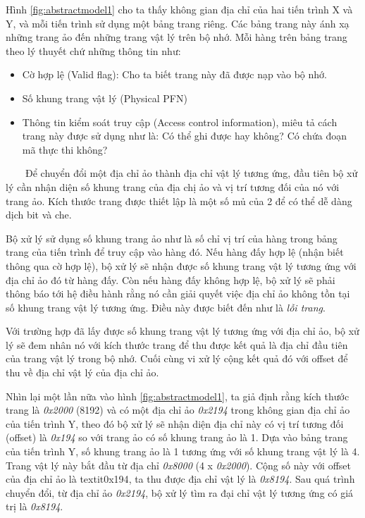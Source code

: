 \documentclass{article}
\begin{document}
Hình \ref{fig:abstractmodel1} cho ta thấy không gian địa chỉ của hai tiến trình X và Y, và mỗi tiến trình sử dụng một bảng trang riêng. Các bảng trang này ánh xạ những trang ảo đến những trang vật lý trên bộ nhớ. Mỗi hàng trên bảng trang theo lý thuyết chứ những thông tin như:
\begin{itemize}
  \item Cờ hợp lệ (Valid flag): Cho ta biết trang này đã được nạp vào bộ nhớ.
  \item Số khung trang vật lý (Physical PFN)
  \item Thông tin kiểm soát truy cập (Access control information), miêu tả cách trang này được sử dụng như là: Có thể ghi được hay không? Có chứa đoạn mã thực thi không?
\end{itemize}
~~~~Để chuyển đổi một địa chỉ ảo thành địa chỉ vật lý tương ứng, đầu tiên bộ xử lý cần nhận diện số khung trang của địa chị ảo và vị trí tương đối của nó với trang ảo. Kích thước trang được thiết lập là một số mủ của 2 để có thể dễ dàng dịch bit và che.\vspace{1em}

Bộ xử lý sử dụng số khung trang ảo như là số chỉ vị trí của hàng trong bảng trang của tiến trình để truy cập vào hàng đó. Nếu hàng đấy hợp lệ (nhận biết thông qua cờ hợp lệ), bộ xử lý sẽ nhận được số khung trang vật lý tương ứng với địa chỉ ảo đó từ hàng đấy. Còn nếu hàng đấy không hợp lệ, bộ xử lý sẽ phải thông báo tới hệ điều hành rằng nó cần giải quyết việc địa chỉ ảo không tồn tại số khung trang vật lý tương ứng. Điều này được biết đến như là \textit{lỗi trang}. \vspace{1em}

Với trường hợp đã lấy được số khung trang vật lý tương ứng với địa chỉ ảo, bộ xử lý sẽ đem nhân nó với kích thước trang để thu được kết quả là địa chỉ đầu tiên của trang vật lý trong bộ nhớ. Cuối cùng vi xử lý cộng kết quả đó với offset để thu về địa chỉ vật lý của địa chỉ ảo.\vspace{1em}

Nhìn lại một lần nữa vào hình \ref{fig:abstractmodel1}, ta giả định rằng kích thước trang là \textit{0x2000} (8192) và có một địa chỉ ảo \textit{0x2194} trong không gian địa chỉ ảo của tiến trình Y, theo đó bộ xử lý sẽ nhận diện địa chỉ này có vị trí tương đối (offset) là \textit{0x194} so với trang ảo có số khung trang ảo là 1. Dựa vào bảng trang của tiến trình Y, số khung trang ảo là 1 tương ứng với số khung trang vật lý là 4. Trang vật lý này bắt đầu từ địa chỉ \textit{0x8000} (4 x \textit{0x2000}). Cộng số này với offset của địa chỉ ảo là textit{0x194}, ta thu được địa chỉ vật lý là \textit{0x8194}. Sau quá trình chuyển đổi, từ địa chỉ ảo \textit{0x2194}, bộ xử lý tìm ra đại chỉ vật lý tương ứng có giá trị là \textit{0x8194}.\vspace{1em}
\end{document}
